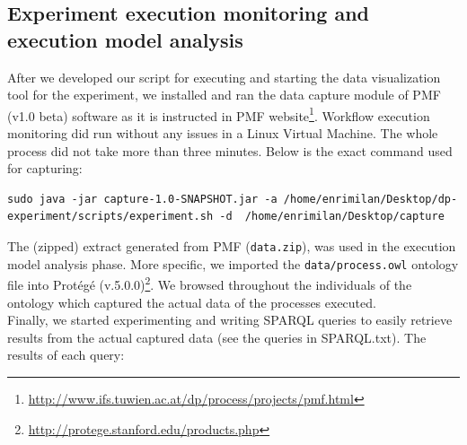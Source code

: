 \documentclass[12pt, a4paper]{article}
\begin{document}
\subsection{Experiment execution monitoring and execution model analysis}
After we developed our script for executing and starting the data visualization tool for the experiment, we installed and ran the data capture module of PMF (v1.0 beta) software as it is instructed in PMF website\footnote{\url{http://www.ifs.tuwien.ac.at/dp/process/projects/pmf.html}}. Workflow execution monitoring did run without any issues in a Linux Virtual Machine. The whole process did not take more than three minutes. Below is the exact command used for capturing:
\begin{lstlisting}[breaklines]
sudo java -jar capture-1.0-SNAPSHOT.jar -a /home/enrimilan/Desktop/dp-experiment/scripts/experiment.sh -d  /home/enrimilan/Desktop/capture
\end{lstlisting}
The (zipped) extract generated from PMF (\verb|data.zip|), was used in the execution model analysis phase. More specific, we imported the \verb|data/process.owl|  ontology file into Protégé (v.5.0.0)\footnote{\url{http://protege.stanford.edu/products.php}}.  We browsed throughout the individuals of the ontology which captured the actual data of the processes executed.\\
Finally, we started experimenting and writing SPARQL queries to easily retrieve results from the actual captured data (see the queries in SPARQL.txt). The results of each query:
\end{document}
